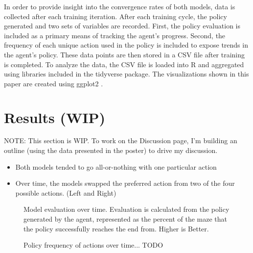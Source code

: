 \documentclass[12pt]{article}
\begin{document}
In order to provide insight into the convergence rates of both models, data is collected after each training iteration.
After each training cycle, the policy generated and two sets of variables are recorded.
First, the policy evaluation is included as a primary means of tracking the agent's progress.
Second, the frequency of each unique action used in the policy is included to expose trends in the agent's policy.
These data points are then stored in a CSV file after training is completed.
To analyze the data, the CSV file is loaded into R \cite{lang_r} and aggregated using libraries included in the tidyverse \cite{lib_tidyverse} package.
The visualizations shown in this paper are created using ggplot2 \cite{lib_ggplot2}.

\section{Results (WIP)}


NOTE: This section is WIP. To work on the Discussion page, I'm building an outline (using the data presented in the poster) to drive my discussion.

\begin{itemize}
	\item Both models tended to go all-or-nothing with one particular action
	\item Over time, the models swapped the preferred action from two of the four possible actions. (Left and Right)
\end{itemize}




\begin{figure}[h]
	
    \caption{Model evaluation over time. Evaluation is calculated from the policy generated by the agent, represented as the percent of the maze that the policy successfully reaches the end from. Higher is Better.}
		\label{fig:evaluation}
\end{figure}

\begin{figure}[h]
	
	\caption{Policy frequency of actions over time... TODO}
	\label{fig:directional}
\end{figure}
\end{document}
